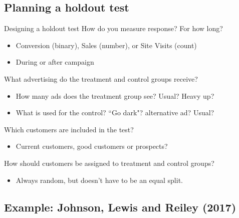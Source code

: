 \documentclass[10pt, aspectratio=169]{beamer}
\begin{document}
\subsection{Planning a holdout test} 

\begin{frame}{Designing a holdout test}
How do you measure response? For how long?
\begin{itemize}
\item Conversion (binary), Sales (number), or Site Visits (count)
\item During or after campaign
\end{itemize}
What advertising do the treatment and control groups receive?\\
\begin{itemize}
\item How many ads does the treatment group see? Usual? Heavy up?
\item What is used for the control? ``Go dark"? alternative ad? Usual?
\end{itemize}
Which customers are included in the test?\\
\begin{itemize}
\item Current customers, good customers or prospects? 
\end{itemize}
How should customers be assigned to treatment and control groups? \\
\begin{itemize}
\item Always random, but doesn't have to be an equal split. 
\end{itemize}
\end{frame}

\subsection{Example: Johnson, Lewis and Reiley (2017)}
\end{document}
